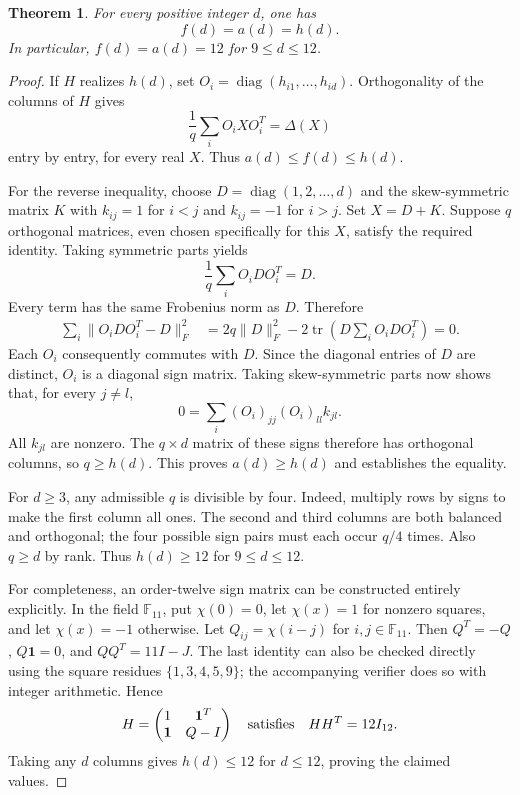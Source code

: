 \documentclass[10pt,a4paper]{article}
\newtheorem{theorem}{Theorem}[section]
\theoremstyle{remark}
\newcommand{\tr}{\operatorname{tr}}
\newcommand{\diag}{\operatorname{diag}}
\newcommand{\norm}[1]{\lVert #1\rVert}
\begin{document}
\begin{theorem}\label{thm:mi08}
For every positive integer $d$, one has
\[
 f(d)=a(d)=h(d).
\]
In particular, $f(d)=a(d)=12$ for $9\leq d\leq12$.
\end{theorem}
\begin{proof}
If $H$ realizes $h(d)$, set $O_i=\diag(h_{i1},\ldots,h_{id})$. Orthogonality of the columns of $H$ gives
\[
 \frac1q\sum_iO_iXO_i^T=\Delta(X)
\]
entry by entry, for every real $X$. Thus $a(d)\leq f(d)\leq h(d)$.

For the reverse inequality, choose $D=\diag(1,2,\ldots,d)$ and the skew-symmetric matrix $K$ with $k_{ij}=1$ for $i<j$ and $k_{ij}=-1$ for $i>j$. Set $X=D+K$. Suppose $q$ orthogonal matrices, even chosen specifically for this $X$, satisfy the required identity. Taking symmetric parts yields
\[
 \frac1q\sum_iO_iDO_i^T=D.
\]
Every term has the same Frobenius norm as $D$. Therefore
\begin{align*}
 \sum_i\norm{O_iDO_i^T-D}_F^2
 &=2q\norm{D}_F^2-2\tr\left(D\sum_iO_iDO_i^T\right)=0.
\end{align*}
Each $O_i$ consequently commutes with $D$. Since the diagonal entries of $D$ are distinct, $O_i$ is a diagonal sign matrix. Taking skew-symmetric parts now shows that, for every $j\ne l$,
\[
 0=\sum_i (O_i)_{jj}(O_i)_{ll}k_{jl}.
\]
All $k_{jl}$ are nonzero. The $q\times d$ matrix of these signs therefore has orthogonal columns, so $q\geq h(d)$. This proves $a(d)\geq h(d)$ and establishes the equality.

For $d\geq3$, any admissible $q$ is divisible by four. Indeed, multiply rows by signs to make the first column all ones. The second and third columns are both balanced and orthogonal; the four possible sign pairs must each occur $q/4$ times. Also $q\geq d$ by rank. Thus $h(d)\geq12$ for $9\leq d\leq12$.

For completeness, an order-twelve sign matrix can be constructed entirely explicitly. In the field $\mathbb F_{11}$, put $\chi(0)=0$, let $\chi(x)=1$ for nonzero squares, and let $\chi(x)=-1$ otherwise. Let $Q_{ij}=\chi(i-j)$ for $i,j\in\mathbb F_{11}$. Then $Q^T=-Q$, $Q\mathbf1=0$, and $QQ^T=11I-J$. The last identity can also be checked directly using the square residues $\{1,3,4,5,9\}$; the accompanying verifier does so with integer arithmetic. Hence
\[
 H=\begin{pmatrix}1&\mathbf1^T\\\mathbf1&Q-I\end{pmatrix}
 \quad\hbox{satisfies}\quad HH^T=12I_{12}.
\]
Taking any $d$ columns gives $h(d)\leq12$ for $d\leq12$, proving the claimed values.
\end{proof}
\end{document}
